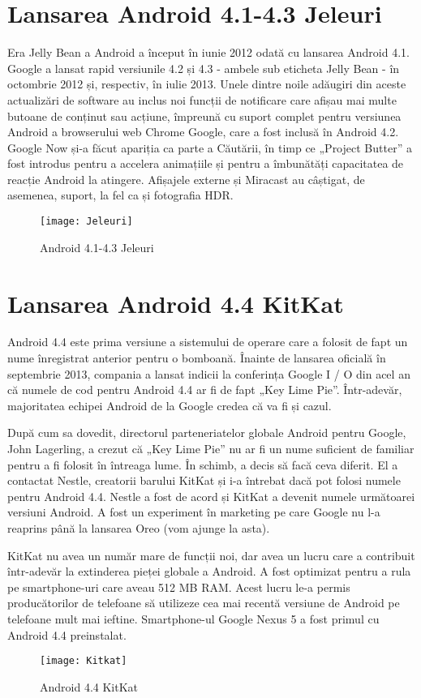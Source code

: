\documentclass[a4paper,12pt]{amsbook}
\begin{document}
\chapter{\Large Lansarea Android 4.1-4.3 Jeleuri}
\par
Era Jelly Bean a Android a început în iunie 2012 odată cu lansarea Android 4.1. Google a lansat rapid versiunile 4.2 și 4.3 - ambele sub eticheta Jelly Bean - în octombrie 2012 și, respectiv, în iulie 2013.
Unele dintre noile adăugiri din aceste actualizări de software au inclus noi funcții de notificare care afișau mai multe butoane de conținut sau acțiune, împreună cu suport complet pentru versiunea Android a browserului web Chrome Google, care a fost inclusă în Android 4.2. Google Now și-a făcut apariția ca parte a Căutării, în timp ce „Project Butter” a fost introdus pentru a accelera animațiile și pentru a îmbunătăți capacitatea de reacție Android la atingere. Afișajele externe și Miracast au câștigat, de asemenea, suport, la fel ca și fotografia HDR.
\begin{figure}[h]
	\centering
	\texttt{[image: Jeleuri]}
	\caption[Jeleuri]{Android 4.1-4.3 Jeleuri}
	\label{fig:jeleuri}
\end{figure}
\par
\chapter{\Large Lansarea Android 4.4 KitKat}
\par
Android 4.4 este prima versiune a sistemului de operare care a folosit de fapt un nume înregistrat anterior pentru o bomboană. Înainte de lansarea oficială în septembrie 2013, compania a lansat indicii la conferința Google I / O din acel an că numele de cod pentru Android 4.4 ar fi de fapt „Key Lime Pie”. Într-adevăr, majoritatea echipei Android de la Google credea că va fi și cazul.

După cum sa dovedit, directorul parteneriatelor globale Android pentru Google, John Lagerling, a crezut că „Key Lime Pie” nu ar fi un nume suficient de familiar pentru a fi folosit în întreaga lume. În schimb, a decis să facă ceva diferit. El a contactat Nestle, creatorii barului KitKat și i-a întrebat dacă pot folosi numele pentru Android 4.4. Nestle a fost de acord și KitKat a devenit numele următoarei versiuni Android. A fost un experiment în marketing pe care Google nu l-a reaprins până la lansarea Oreo (vom ajunge la asta).

KitKat nu avea un număr mare de funcții noi, dar avea un lucru care a contribuit într-adevăr la extinderea pieței globale a Android. A fost optimizat pentru a rula pe smartphone-uri care aveau 512 MB RAM. Acest lucru le-a permis producătorilor de telefoane să utilizeze cea mai recentă versiune de Android pe telefoane mult mai ieftine. Smartphone-ul Google Nexus 5 a fost primul cu Android 4.4 preinstalat.
\begin{figure}[h]
	\centering
	\texttt{[image: Kitkat]}
	\caption[KitKat]{Android 4.4 KitKat}
	\label{fig:kitkat}
\end{figure}
\par
\end{document}
